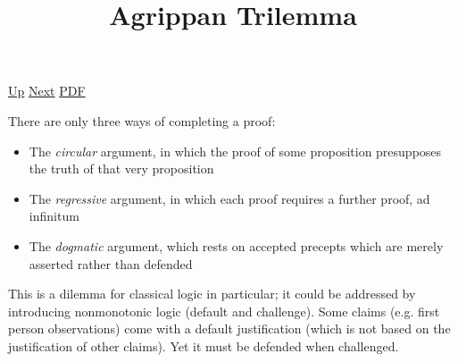 \documentclass[12pt,a4paper]{report}
\begin{document}
 \href{doc/phil/PhilProblems.html}{Up} 
 \href{doc/phil/PhilProblems/BradleysProblem.html}{Next} 
 \href{doc/phil/PhilProblems/AgrippanTrilemma.pdf}{PDF} 
\title{Agrippan Trilemma}
There are only three ways of completing a proof:
\begin{itemize}
    \item The \emph{circular} argument, in which the proof of some proposition presupposes the truth of that very proposition
    \item The \emph{regressive} argument, in which each proof requires a further proof, ad infinitum
    \item The \emph{dogmatic} argument, which rests on accepted precepts which are merely asserted rather than defended
\end{itemize}

This is a dilemma for classical logic in particular; it could be addressed by introducing nonmonotonic logic (default and challenge). Some claims (e.g. first person observations) come with a default justification (which is not based on the justification of other claims). Yet it must be defended when challenged.
\end{document}
